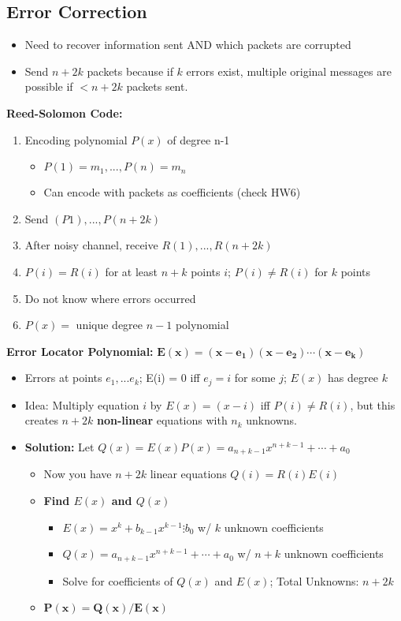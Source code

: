 \documentclass{article}\usepackage{amsmath,amssymb,amsthm,tikz,tkz-graph,color,chngpage,soul,hyperref,csquotes,graphicx,floatrow,polynom}\newcommand*{\QEDB}{\hfill\ensuremath{\square}}\newtheorem*{prop}{Proposition}\renewcommand{\theenumi}{\alph{enumi}}\usepackage[shortlabels]{enumitem}\usepackage[nobreak=true]{mdframed}\usetikzlibrary{matrix,calc}\MakeOuterQuote{"}\usepackage[margin=0.75in]{geometry} \newtheorem{theorem}{Theorem}
\begin{document}
\subsection*{Error Correction}
\begin{itemize}
\item Need to recover information sent AND which packets are corrupted
\item Send $n+2k$ packets because if $k$ errors exist, multiple original messages are possible if $< n+2k$ packets sent.
\end{itemize}
\begin{mdframed}
\textbf{Reed-Solomon Code:}
\begin{enumerate}[1.]
\item Encoding polynomial $P(x)$ of degree n-1
    \begin{itemize}
    \item $P(1) = m_1,..., P(n) = m_n$
    \item Can encode with packets as coefficients (check HW6)
    \end{itemize}
\item Send $(P1), ..., P(n+2k)$
\item After noisy channel, receive $R(1), ..., R(n+2k)$
\item $P(i) = R(i)$ for at least $n+k$ points $i$; $P(i) \ne R(i)$ for $k$ points
\item Do not know where errors occurred
\item $P(x) =$ unique degree $n-1$ polynomial
\end{enumerate}
\textbf{Error Locator Polynomial:} $\boldsymbol{E(x)=(x-e_1)(x-e_2)\cdots(x-e_k)}$
\begin{itemize}
\item Errors at points $e_1, ... e_k$; E(i) = 0 iff $e_j = i$ for some $j$; $E(x)$ has degree $k$
\item Idea: Multiply equation $i$ by $E(x) = (x - i)$ iff $P(i) \ne R(i)$, but this creates $n+2k$ \textbf{non-linear} equations with $n_k$ unknowns.
\item \textbf{Solution:} Let $Q(x) = E(x)P(x) = a_{n+k-1}x^{n+k-1} + \cdots + a_0$
    \begin{itemize}
    \item Now you have $n+2k$ linear equations $Q(i) = R(i)E(i)$
    \item \textbf{Find $E(x)$ and $Q(x)$}
        \begin{itemize}
            \item $E(x) = x^k+b_{k-1}x^{k-1}\vdots b_0$ w/ $k$ unknown coefficients
            \item $Q(x) = a_{n+k-1}x^{n+k-1} + \cdots + a_0$ w/ $n+k$ unknown coefficients
            \item Solve for coefficients of $Q(x)$ and $E(x)$; Total Unknowns: $n+2k$
        \end{itemize}
    \item $\boldsymbol{P(x) = Q(x)/E(x)}$
    \end{itemize}
\end{itemize}
\end{mdframed}
\end{document}
